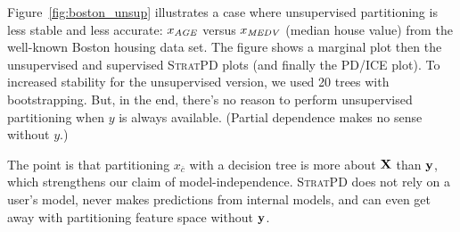 \documentclass[12pt]{article}
\newcommand{\figref}[1]{Figure~\ref{#1}}
\newcommand{\spd}{\fontfamily{cmr}\textsc{\small StratPD}}
\newcommand{\xnc}{$x_{\overline{c}}$}
\begin{document}
\figref{fig:boston_unsup} illustrates a case where unsupervised partitioning is less stable and less accurate: $x_{\it AGE}$ versus $x_{\it MEDV}$ (median house value) from the well-known Boston housing data set. The figure shows a marginal plot then the unsupervised and supervised \spd{} plots (and finally the PD/ICE plot). To increased stability for the unsupervised version, we used 20 trees with bootstrapping. But, in the end, there's no reason to perform unsupervised partitioning when $y$ is always available. (Partial dependence makes no sense without $y$.) 

The point is that partitioning \xnc{}  with a decision tree is more about $\bf X$ than $\bf y$, which strengthens our claim of model-independence. \spd{} does not rely on a user's model, never makes predictions from internal models, and can even get away with partitioning feature space without $\bf y$.
\end{document}
